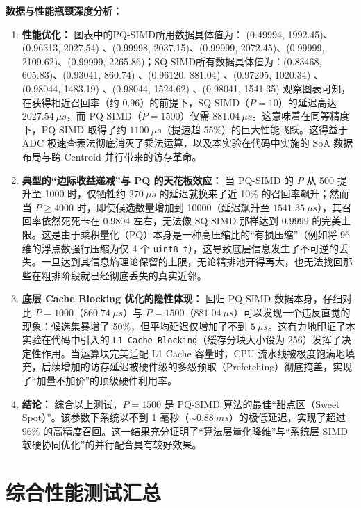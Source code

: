 \documentclass[UTF8,a4paper,10pt]{ctexart}
\begin{document}
\textbf{数据与性能瓶颈深度分析：}
\begin{enumerate}
    \item \textbf{性能优化：} 
    图表中的PQ-SIMD所用数据具体值为： (0.49994, 1992.45)、(0.96313, 2027.54)
    、(0.99998, 2037.15)、(0.99999, 2072.45)、(0.99999, 2109.62)、(0.99999, 2265.86)；SQ-SIMD所有数据具体值为：(0.83468, 605.83)、(0.93041, 860.74) 、(0.96120, 881.04) 、(0.97295, 1020.34) 、(0.98044, 1483.19) 、(0.98044, 1524.62) 、(0.98041, 1541.35)
    观察图表可知，在获得相近召回率（约 $0.96$）的前提下，SQ-SIMD（$P=10$）的延迟高达 $2027.54\ \mu s$，而 PQ-SIMD（$P=1500$）仅需 $881.04\ \mu s$。这意味着在同等精度下，PQ-SIMD 取得了约 $1100\ \mu s$（提速超 55\%）的巨大性能飞跃。这得益于 ADC 极速查表法彻底消灭了乘法运算，以及本实验在代码中实施的 SoA 数据布局与跨 Centroid 并行带来的访存革命。
    
    \item \textbf{典型的“边际收益递减”与 PQ 的天花板效应：}
    当 PQ-SIMD 的 $P$ 从 500 提升至 1000 时，仅牺牲约 $270\ \mu s$ 的延迟就换来了近 10\% 的召回率飙升；然而当 $P \ge 4000$ 时，即使候选数量增加到 10000（延迟飙升至 $1541.35\ \mu s$），其召回率依然死死卡在 $0.9804$ 左右，无法像 SQ-SIMD 那样达到 $0.9999$ 的完美上限。这是由于乘积量化（PQ）本身是一种高压缩比的“有损压缩”（例如将 96 维的浮点数强行压缩为仅 4 个 \texttt{uint8\_t}），这导致底层信息发生了不可逆的丢失。一旦达到其信息熵理论保留的上限，无论精排池开得再大，也无法找回那些在粗排阶段就已经彻底丢失的真实近邻。
    
    \item \textbf{底层 Cache Blocking 优化的隐性体现：} 回归 PQ-SIMD 数据本身，仔细对比 $P=1000$（$860.74\ \mu s$）与 $P=1500$（$881.04\ \mu s$）可以发现一个违反直觉的现象：候选集暴增了 50\%，但平均延迟仅增加了不到 $5\ \mu s$。这有力地印证了本实验在代码中引入的 \texttt{L1 Cache Blocking}（缓存分块大小设为 256）发挥了决定性作用。当运算块完美适配 L1 Cache 容量时，CPU 流水线被极度饱满地填充，后续增加的访存延迟被硬件级的多级预取（Prefetching）彻底掩盖，实现了“加量不加价”的顶级硬件利用率。
    
    \item \textbf{结论：} 综合以上测试，$P=1500$ 是 PQ-SIMD 算法的最佳“甜点区（Sweet Spot）”。该参数下系统以不到 1 毫秒（$\sim 0.88\ ms$）的极低延迟，实现了超过 $96\%$ 的高精度召回。这一结果充分证明了“算法层量化降维”与“系统层 SIMD 软硬协同优化”的并行配合具有较好效果。
\end{enumerate}

\section{综合性能测试汇总}
\end{document}
